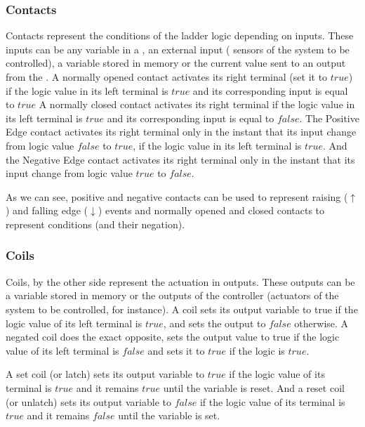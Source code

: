 \subsubsection{Contacts}
Contacts represent the conditions of the ladder logic depending on inputs. These inputs can be any variable in a
\PLC, an external input ( sensors of the system to be controlled), a variable stored in memory or the current
value sent to an output from the \PLC. A normally opened contact
activates its right terminal (set it to $true$) if the logic value in its left terminal
is $true$ and its corresponding input is equal to $true$ 
A normally closed contact activates its right terminal if the logic value in its
left terminal is $true$ and its corresponding input is equal to $false$.
The Positive Edge contact activates its right terminal only in the instant that
its input change from logic value $false$ to $true$, if the logic value in its
left terminal is $true$. And the Negative Edge contact activates its right
terminal only in the instant that its input change from logic value $true$ to
$false$.

As we can see, positive and negative contacts can be used to represent raising ($\uparrow$)
and falling edge  ($\downarrow$) events and normally opened and closed contacts
to represent conditions (and their negation).

\subsubsection{Coils}

Coils, by the other side represent the actuation in outputs. These
outputs can be a variable stored in memory or the outputs
of the controller (actuators of the system to be controlled, for instance). 
A coil sets its output variable to true if the logic value of its left terminal is $true$,
and sets the output to $false$ otherwise.
A negated coil does the exact opposite, sets the output value to true if the logic
value of its left terminal is $false$ and sets it to $true$ if the logic is
$true$.

A set coil (or latch) sets its output variable to $true$ if the logic value of its
terminal is $true$ and it remains $true$ until the variable is reset.
And a reset coil (or unlatch) sets its output variable to $false$ if the logic
value of its terminal is $true$ and it remains $false$ until the variable is
set.

